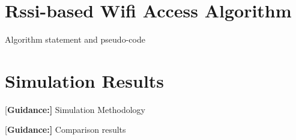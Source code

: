 \documentclass[journal]{IEEEtran}
\begin{document}
\section{Rssi-based Wifi Access Algorithm}

Algorithm statement and pseudo-code

\section{Simulation Results}
{[\bf Guidance:]} Simulation Methodology

{[\bf Guidance:]} Comparison results

%
%



%
%
\end{document}
